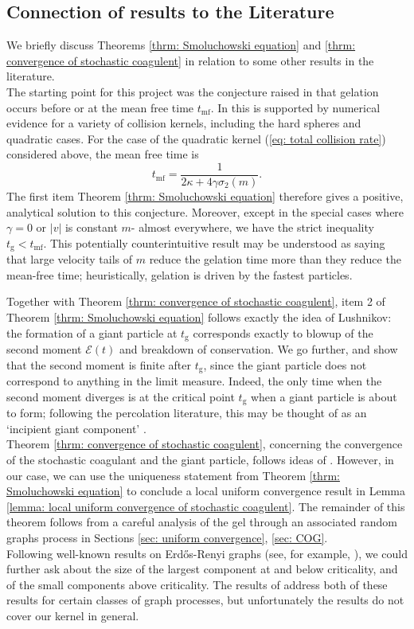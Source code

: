 \documentclass[11pt, notitlepage]{article}
\begin{document}
\subsection{\textbf{Connection of results to the Literature}}
We briefly discuss Theorems \ref{thrm: Smoluchowski equation} and \ref{thrm: convergence of stochastic coagulent} in relation to some other results in the literature. \medskip \\ The starting point for this project was the conjecture raised in \cite{PSW17} that gelation occurs before or at the mean free time $t_\mathrm{mf}$. In \cite{PSW17} this is supported by numerical evidence for a variety of collision kernels, including the hard spheres and quadratic cases. For the case of the quadratic kernel (\ref{eq: total collision rate}) considered above, the mean free time is \begin{equation} t_\mathrm{mf}=\frac{1}{2\kappa+4\gamma\sigma_2(m)}. \end{equation} The first item Theorem \ref{thrm: Smoluchowski equation} therefore gives a positive, analytical solution to this conjecture. Moreover, except in the special cases where $\gamma=0$ or $|v|$ is constant $m$- almost everywhere, we have the strict inequality $t_\mathrm{g}<t_\mathrm{mf}$. This potentially counterintuitive result may be understood as saying that large velocity tails of $m$ reduce the gelation time more than they reduce the mean-free time; heuristically, gelation is driven by the fastest particles.

Together with Theorem \ref{thrm: convergence of stochastic coagulent}, item 2 of Theorem \ref{thrm: Smoluchowski equation} follows exactly the idea of Lushnikov: the formation of a giant particle at $t_\mathrm{g}$ corresponds exactly to blowup of the second moment $\mathcal{E}(t)$ and breakdown of conservation. We go further, and show that the second moment is finite after $t_\mathrm{g}$, since the giant particle does not correspond to anything in the limit measure. Indeed, the only time when the second moment diverges is at the critical point $t_\mathrm{g}$ when a giant particle is about to form; following the percolation literature, this may be thought of as an `incipient giant component' \cite{Ald16}. \medskip \\ Theorem \ref{thrm: convergence of stochastic coagulent}, concerning the convergence of the stochastic coagulant and the giant particle, follows ideas of \cite[Theorem 4.1]{N00}. However, in our case, we can use the uniqueness statement from Theorem \ref{thrm: Smoluchowski equation} to conclude a local uniform convergence result in Lemma \ref{lemma: local uniform convergence of stochastic coagulent}. The remainder of this theorem follows from a careful analysis of the gel through an associated random graphs process in Sections \ref{sec: uniform convergence}, \ref{sec: COG}. \medskip \\ Following well-known results on Erd\H{o}s-Renyi graphs (see, for example, \cite{B01}), we could further ask about the size of the largest component at and below criticality, and of the small components above criticality.  The results of \cite{BJR07} address both of these results for certain classes of graph processes, but unfortunately the results do not cover our kernel in general.   
\end{document}
